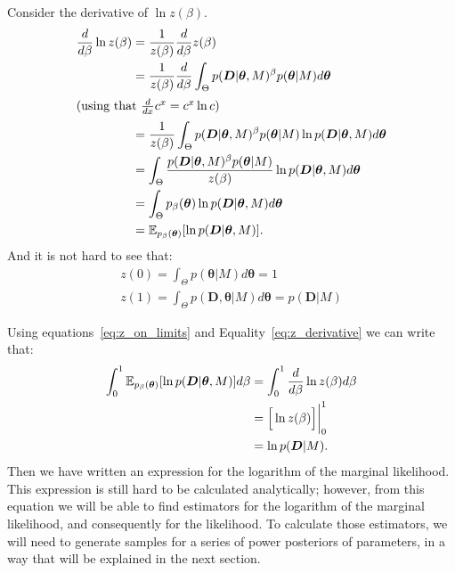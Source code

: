 Consider the derivative of $\ln z(\beta)$.
\begin{align}
    \frac{d}{d\beta} \ln z(\beta) &= \frac{1}{z(\beta)}  
        \frac{d}{d\beta} z(\beta) \notag\\
    &= 
    \frac{1}{z(\beta)} \frac{d}{d\beta} 
    \int_\Theta p ({\bm D} | {\bm \theta}, M)^\beta 
    p({\bm \theta} | M) d{\bm \theta} \notag\\
    \shortintertext{(using that $\frac{d}{dx} c^x = c^x \ln c$)}
    &= 
    \frac{1}{z(\beta)} \int_\Theta p ({\bm D} | {\bm \theta}, M)^\beta 
    p({\bm \theta} | M) \ln p({\bm D}|{\bm \theta}, M)
    d{\bm \theta} \notag\\
    &= 
    \int_\Theta \frac{p ({\bm D} | {\bm \theta}, M)^\beta 
        p({\bm \theta} | M)}
                     {z(\beta)}
    \ln p({\bm D}| {\bm \theta}, M)d{\bm \theta} \notag\\
    &=
    \int_\Theta p_\beta ({\bm \theta}) 
    \ln p ({\bm D} | {\bm \theta}, M)d{\bm \theta} \notag\\ 
    &=
    \mathbb{E}_{p_\beta ({\bm \theta})} 
    [\ln p({\bm D} | {\bm \theta}, M)]. \label{eq:z_derivative}
\end{align}
And it is not hard to see that:
\begin{equation}
\begin{gathered}
    z (0) = \int_\Theta p ({\bm \theta} | M)d{\bm \theta} = 1 \\
    z (1) = \int_\Theta p ({\bm D}, {\bm \theta} | M)d
        {\bm \theta} = p ({\bm D} | M)
    \label{eq:z_on_limits}
\end{gathered}
\end{equation}

Using equations~\ref{eq:z_on_limits} and Equality~\ref{eq:z_derivative}
we can write that:
\begin{align}
    \int_0^1 \mathbb{E}_{p_\beta ({\bm \theta})} 
        [\ln p({\bm D}|{\bm \theta}, M)]d\beta 
    &= \int_0^1 \frac{d}{d\beta} \ln z(\beta) d\beta \notag \\
    &= \Big[\ln z(\beta)\Big]\bigg\rvert^1_0 \notag \\
    &= \ln p ({\bm D} | M).
    \label{eq:thermodynamic_integral_2}
\end{align}
Then we have written an expression for the logarithm of the marginal
likelihood. This expression is still hard to be calculated analytically;
however, from this equation we will be able to find estimators for
the logarithm of the marginal likelihood, and consequently for the
likelihood. To calculate those estimators, we will need to generate 
samples for a series of power posteriors of parameters, in a way that will
be explained in the next section.

